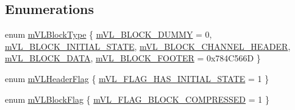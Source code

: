 \subsection*{Enumerations}
\begin{DoxyCompactItemize}
\item 
enum \mbox{\hyperlink{video-logger_8c_a565fbaa07fe50c5ef36224a0f586048a}{m\+V\+L\+Block\+Type}} \{ \newline
\mbox{\hyperlink{video-logger_8c_a565fbaa07fe50c5ef36224a0f586048aab633461be1c66917f469963cc0eeb9c7}{m\+V\+L\+\_\+\+B\+L\+O\+C\+K\+\_\+\+D\+U\+M\+MY}} = 0, 
\mbox{\hyperlink{video-logger_8c_a565fbaa07fe50c5ef36224a0f586048aa65a9cdc4a92556634a393026e168900d}{m\+V\+L\+\_\+\+B\+L\+O\+C\+K\+\_\+\+I\+N\+I\+T\+I\+A\+L\+\_\+\+S\+T\+A\+TE}}, 
\mbox{\hyperlink{video-logger_8c_a565fbaa07fe50c5ef36224a0f586048aa6e73f830afca38ee2b752d9ea097a335}{m\+V\+L\+\_\+\+B\+L\+O\+C\+K\+\_\+\+C\+H\+A\+N\+N\+E\+L\+\_\+\+H\+E\+A\+D\+ER}}, 
\mbox{\hyperlink{video-logger_8c_a565fbaa07fe50c5ef36224a0f586048aae8a8a535bb511df0b69ca819d7579b71}{m\+V\+L\+\_\+\+B\+L\+O\+C\+K\+\_\+\+D\+A\+TA}}, 
\newline
\mbox{\hyperlink{video-logger_8c_a565fbaa07fe50c5ef36224a0f586048aae2aac6b3dfc1785c2f32778d21a5f012}{m\+V\+L\+\_\+\+B\+L\+O\+C\+K\+\_\+\+F\+O\+O\+T\+ER}} = 0x784\+C566D
 \}
\item 
enum \mbox{\hyperlink{video-logger_8c_a6bddeb07afc4e7350f6c1b9587ba8a7e}{m\+V\+L\+Header\+Flag}} \{ \mbox{\hyperlink{video-logger_8c_a6bddeb07afc4e7350f6c1b9587ba8a7ea39c3448e1ef1be5d020feb64d5ba9355}{m\+V\+L\+\_\+\+F\+L\+A\+G\+\_\+\+H\+A\+S\+\_\+\+I\+N\+I\+T\+I\+A\+L\+\_\+\+S\+T\+A\+TE}} = 1
 \}
\item 
enum \mbox{\hyperlink{video-logger_8c_af34b32cd58509f1d6f7c6ad935657cc0}{m\+V\+L\+Block\+Flag}} \{ \mbox{\hyperlink{video-logger_8c_af34b32cd58509f1d6f7c6ad935657cc0aae8b041cbca0730e37518df9b56a59f0}{m\+V\+L\+\_\+\+F\+L\+A\+G\+\_\+\+B\+L\+O\+C\+K\+\_\+\+C\+O\+M\+P\+R\+E\+S\+S\+ED}} = 1
 \}
\end{DoxyCompactItemize}
